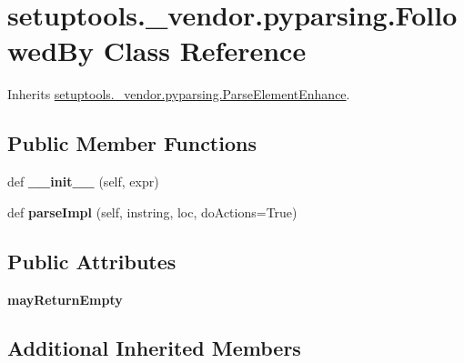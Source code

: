 \hypertarget{classsetuptools_1_1__vendor_1_1pyparsing_1_1_followed_by}{}\section{setuptools.\+\_\+vendor.\+pyparsing.\+Followed\+By Class Reference}
\label{classsetuptools_1_1__vendor_1_1pyparsing_1_1_followed_by}


Inherits \hyperlink{classsetuptools_1_1__vendor_1_1pyparsing_1_1_parse_element_enhance}{setuptools.\+\_\+vendor.\+pyparsing.\+Parse\+Element\+Enhance}.

\subsection*{Public Member Functions}
\begin{DoxyCompactItemize}
\item 
\mbox{\label{classsetuptools_1_1__vendor_1_1pyparsing_1_1_followed_by_ab11bf746b66b008308751ba04421b142}} 
def {\bfseries \+\_\+\+\_\+init\+\_\+\+\_\+} (self, expr)
\item 
\mbox{\label{classsetuptools_1_1__vendor_1_1pyparsing_1_1_followed_by_abf358067885516613c5b35ce5447558f}} 
def {\bfseries parse\+Impl} (self, instring, loc, do\+Actions=True)
\end{DoxyCompactItemize}
\subsection*{Public Attributes}
\begin{DoxyCompactItemize}
\item 
\mbox{\label{classsetuptools_1_1__vendor_1_1pyparsing_1_1_followed_by_a534e99b8b37694468a8cca1f4572d589}} 
{\bfseries may\+Return\+Empty}
\end{DoxyCompactItemize}
\subsection*{Additional Inherited Members}


